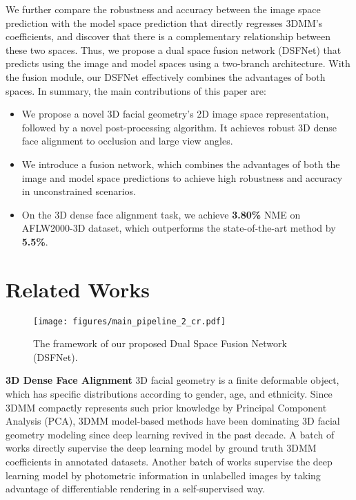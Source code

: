 \documentclass[10pt,twocolumn,letterpaper]{article}
\begin{document}
We further compare the robustness and accuracy between the image space prediction with the model space prediction that directly regresses 3DMM's coefficients, and discover that there is a complementary relationship between these two spaces. 
Thus, we propose a dual space fusion network (DSFNet) that predicts using the image and model spaces using a two-branch architecture. With the fusion module, our DSFNet effectively combines the advantages of both spaces. In summary, the main contributions of this paper are:

\begin{itemize}
    \item We propose a novel 3D facial geometry's 2D image space representation, followed by a novel post-processing  algorithm. It achieves robust 3D dense face alignment to occlusion and large view angles. 
\item We introduce a fusion network, which combines the advantages of both the image and model space predictions to achieve high robustness and accuracy in unconstrained scenarios.
\item On the 3D dense face alignment task, we achieve \textbf{3.80\%} NME on AFLW2000-3D dataset, which outperforms the state-of-the-art method by \textbf{5.5\%}. 
\end{itemize}




\section{Related Works}
\label{sec:rela}


\begin{figure*}
\centering
    {\texttt{[image: figures/main\_pipeline\_2\_cr.pdf]}}
    \caption{The framework of our proposed Dual Space Fusion Network (DSFNet).}
    \label{fig:main_pipeline}
\end{figure*}


\noindent \textbf{3D Dense Face Alignment} 
3D facial geometry is a finite deformable object, which has specific distributions according to gender, age, and ethnicity. Since 3DMM compactly represents such prior knowledge by Principal Component Analysis (PCA), 3DMM model-based methods have been dominating 3D facial geometry modeling since deep learning revived in the past decade. A batch  of works \cite{feng2018prn, wu2021synergy, zhu2016face, guo2020towards, zielonka2022towards} directly supervise the deep learning model by ground truth 3DMM coefficients in annotated datasets. Another batch  of works \cite{deng2019accurate, DECA:Siggraph2021, shang2020self, wen2021self, dib2022s2f2, sanyal2019learning} supervise the deep learning model by photometric information in unlabelled images by taking advantage of differentiable rendering in a self-supervised way. 
\end{document}
